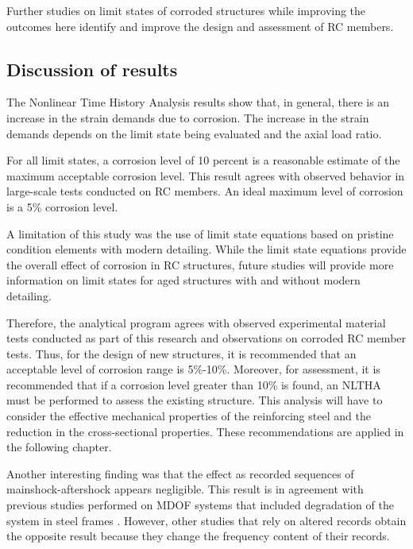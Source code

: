 Further studies on limit states of corroded structures while improving the outcomes here identify and improve the design and assessment of RC members.

\subsection{Discussion of results}

The Nonlinear Time History Analysis results show that, in general, there is an increase in the strain demands due to corrosion. The increase in the strain demands depends on the limit state being evaluated and the axial load ratio. 

For all limit states, a corrosion level of 10 percent is a reasonable estimate of the maximum acceptable corrosion level. This result agrees with observed behavior in large-scale tests conducted on RC members. An ideal maximum level of corrosion is a 5\% corrosion level.

A limitation of this study was the use of limit state equations based on pristine condition elements with modern detailing. While the limit state equations provide the overall effect of corrosion in RC structures, future studies will provide more information on limit states for aged structures with and without modern detailing.

Therefore, the analytical program agrees with observed experimental material tests conducted as part of this research and observations on corroded RC member tests. Thus, for the design of new structures, it is recommended that an acceptable level of corrosion range is 5\%-10\%. Moreover, for assessment, it is recommended that if a corrosion level greater than 10\% is found, an NLTHA must be performed to assess the existing structure. This analysis will have to consider the effective mechanical properties of the reinforcing steel and the reduction in the cross-sectional properties. These recommendations are applied in the following chapter. 

Another interesting finding was that the effect as recorded sequences of mainshock-aftershock appears negligible. This result is in agreement with previous studies performed on MDOF systems that included degradation of the system in steel frames \cite{Ruiz-Garcia2011}. However, other studies that rely on altered records obtain the opposite result because they change the frequency content of their records.